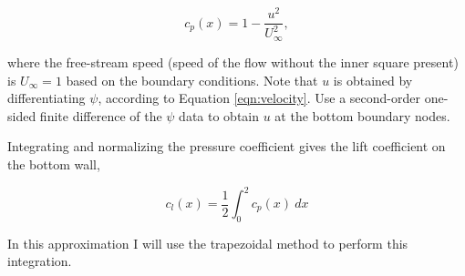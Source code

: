     \begin{equation}
        c_p(x) = 1 - \frac{u^2}{U_\infty^2},
        \label{eqn:cp}
    \end{equation}

    where the free-stream speed (speed of the flow without the inner square present) is $U_\infty = 1$ based on the boundary conditions. Note that $u$ is obtained by differentiating $\psi$, according to Equation \ref{eqn:velocity}. Use a second-order one-sided finite difference of the $\psi$ data to obtain $u$ at the bottom boundary nodes.

    \medskip
    Integrating and normalizing the pressure coefficient gives the lift coefficient on the bottom wall,

    \begin{equation}
        c_l(x) = \frac{1}{2}\int_0^2c_p(x)\ dx
        \label{eqn:cl}
    \end{equation}

    In this approximation I will use the trapezoidal method to perform this integration.
